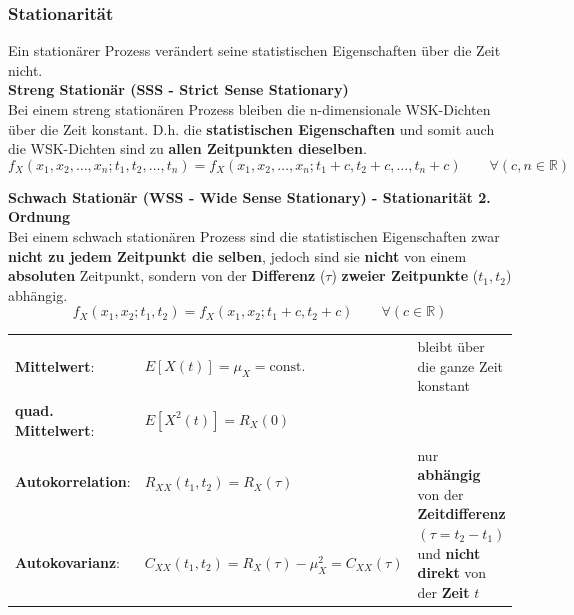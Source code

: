 \subsubsection{Stationarität}
Ein stationärer Prozess verändert seine statistischen Eigenschaften über die Zeit nicht. \\

\textbf{Streng Stationär (SSS - Strict Sense Stationary)}\\
Bei einem streng stationären Prozess bleiben die n-dimensionale WSK-Dichten über die
Zeit konstant. D.h. die \textbf{statistischen Eigenschaften} und somit auch die WSK-Dichten sind zu 
\textbf{allen Zeitpunkten dieselben}.
$$ f_X(x_1, x_2, \ldots, x_n; t_1, t_2, \ldots, t_n) =
		f_X(x_1, x_2, \ldots, x_n; t_1+c, t_2+c, \ldots, t_n+c) \qquad \forall (c,n \in
		\mathbb{R})$$

\textbf{Schwach Stationär (WSS - Wide Sense Stationary) - Stationarität 2. Ordnung}\\
Bei einem schwach stationären Prozess sind die statistischen Eigenschaften zwar
\textbf{nicht zu jedem Zeitpunkt die selben}, jedoch sind sie \textbf{nicht} von einem \textbf{absoluten} Zeitpunkt, sondern
von der \textbf{Differenz} ($\tau$) \textbf{zweier Zeitpunkte} ($t_1, t_2$) abhängig.  \\ 
$$ f_X(x_1, x_2; t_1, t_2) = f_X(x_1, x_2; t_1+c, t_2+c) \qquad \forall (c \in
		\mathbb{R})$$
\renewcommand{\arraystretch}{1.4}
\begin{tabular}[c]{ p{3.3cm}  p{6.5cm} p{8cm} }
	\textbf{Mittelwert}: 	&  $E[X(t)] = \mu_{X} = \text{const.}$  
							& bleibt über die ganze Zeit konstant\\ 
	\textbf{quad. Mittelwert}: 	&  $E[X^{2}(t)] = R_{X}(0)$  \\ 
	\textbf{Autokorrelation}: 	& 	$R_{XX}(t_{1},t_{2}) = R_{X}(\tau)$
	& \multirow{2}{8cm}{nur \textbf{abhängig} von der \textbf{Zeitdifferenz} $(\tau = t_2 - t_1)$ und \textbf{nicht direkt} von
	 der \textbf{Zeit} $t$} \\
	 \textbf{Autokovarianz}:		& $ C_{XX}(t_{1},t_{2}) = R_{X}(\tau) - \mu_{X}^{2} = C_{XX}(\tau)$ \\
\end{tabular}
\renewcommand{\arraystretch}{1}
 
